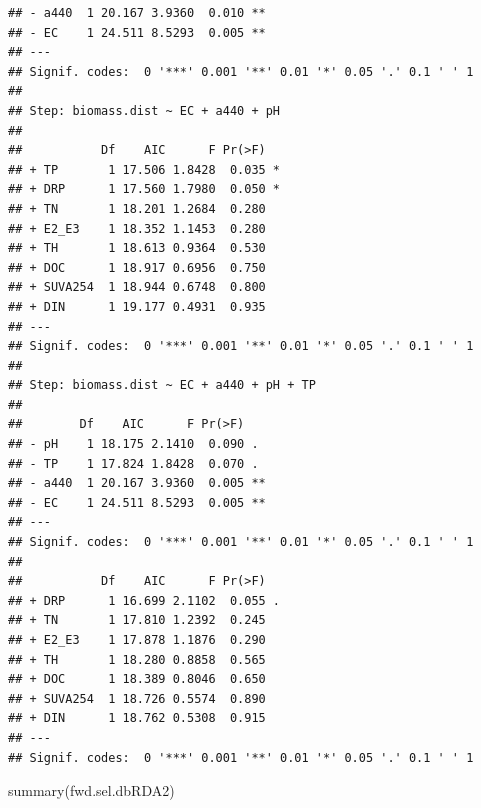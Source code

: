 \documentclass[
]{book}
\newenvironment{Shaded}{\begin{snugshade}}{\end{snugshade}}
\newcommand{\FunctionTok}[1]{\textcolor[rgb]{0.00,0.00,0.00}{#1}}
\newcommand{\NormalTok}[1]{#1}
\begin{document}
\begin{verbatim}
## - a440  1 20.167 3.9360  0.010 **
## - EC    1 24.511 8.5293  0.005 **
## ---
## Signif. codes:  0 '***' 0.001 '**' 0.01 '*' 0.05 '.' 0.1 ' ' 1
## 
## Step: biomass.dist ~ EC + a440 + pH 
## 
##           Df    AIC      F Pr(>F)  
## + TP       1 17.506 1.8428  0.035 *
## + DRP      1 17.560 1.7980  0.050 *
## + TN       1 18.201 1.2684  0.280  
## + E2_E3    1 18.352 1.1453  0.280  
## + TH       1 18.613 0.9364  0.530  
## + DOC      1 18.917 0.6956  0.750  
## + SUVA254  1 18.944 0.6748  0.800  
## + DIN      1 19.177 0.4931  0.935  
## ---
## Signif. codes:  0 '***' 0.001 '**' 0.01 '*' 0.05 '.' 0.1 ' ' 1
## 
## Step: biomass.dist ~ EC + a440 + pH + TP 
## 
##        Df    AIC      F Pr(>F)   
## - pH    1 18.175 2.1410  0.090 . 
## - TP    1 17.824 1.8428  0.070 . 
## - a440  1 20.167 3.9360  0.005 **
## - EC    1 24.511 8.5293  0.005 **
## ---
## Signif. codes:  0 '***' 0.001 '**' 0.01 '*' 0.05 '.' 0.1 ' ' 1
## 
##           Df    AIC      F Pr(>F)  
## + DRP      1 16.699 2.1102  0.055 .
## + TN       1 17.810 1.2392  0.245  
## + E2_E3    1 17.878 1.1876  0.290  
## + TH       1 18.280 0.8858  0.565  
## + DOC      1 18.389 0.8046  0.650  
## + SUVA254  1 18.726 0.5574  0.890  
## + DIN      1 18.762 0.5308  0.915  
## ---
## Signif. codes:  0 '***' 0.001 '**' 0.01 '*' 0.05 '.' 0.1 ' ' 1
\end{verbatim}

\begin{Shaded}
\begin{Highlighting}[]
\FunctionTok{summary}\NormalTok{(fwd.sel.dbRDA2)}
\end{Highlighting}
\end{Shaded}
\end{document}
